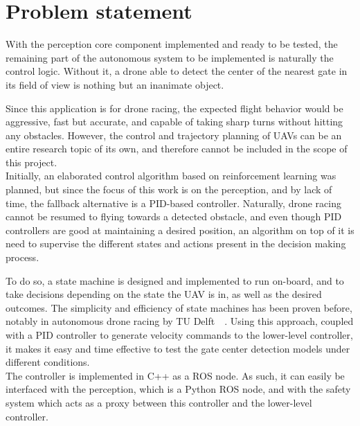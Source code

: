 \section{Problem statement}

With the perception core component implemented and ready to be tested, the
remaining part of the autonomous system to be implemented is naturally the
control logic. Without it, a drone able to detect the center of the nearest
gate in its field of view is nothing but an inanimate object.

Since this application is for drone racing, the expected flight behavior would
be aggressive, fast but accurate, and capable of taking sharp turns without
hitting any obstacles. However, the control and trajectory planning of UAVs can
be an entire research topic of its own, and therefore cannot be included in the
scope of this project.\\

Initially, an elaborated control algorithm based on reinforcement learning was
planned, but since the focus of this work is on the perception, and by lack of
time, the fallback alternative is a PID-based controller. Naturally, drone
racing cannot be resumed to flying towards a detected obstacle, and even though
PID controllers are good at maintaining a desired position, an algorithm on top
of it is need to supervise the different states and actions present in the
decision making process.

To do so, a state machine is designed and implemented to run on-board, and to
take decisions depending on the state the UAV is in, as well as the desired
outcomes. The simplicity and efficiency of state machines has been proven
before, notably in autonomous drone racing by TU Delft~\etal~\cite{State
Machine based High Level Navigation}. 
Using this approach, coupled with a PID controller to generate velocity
commands to the lower-level controller, it makes it easy and time effective to
test the gate center detection models under different conditions.\\

The controller is implemented in C++ as a ROS node. As such, it can easily be
interfaced with the perception, which is a Python ROS node, and with the safety
system which acts as a proxy between this controller and the lower-level
controller.

